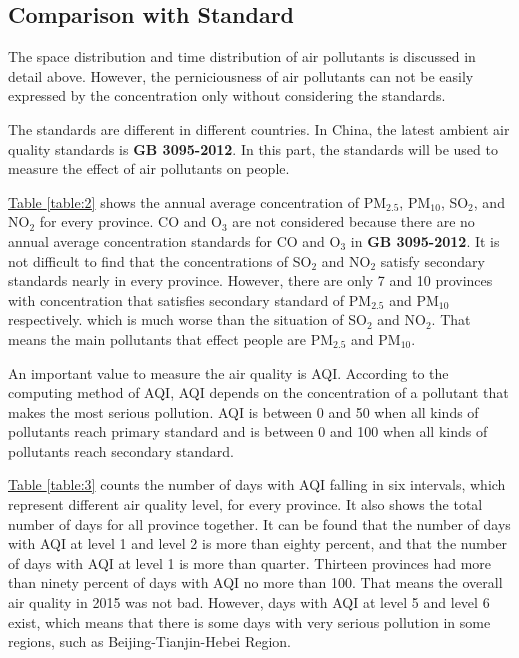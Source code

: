 \documentclass[letterpaper]{article}
\begin{document}
\begin{CJK*}{UTF8}{gkai}
\section{Comparison with Standard}

The space distribution and time distribution of air pollutants is discussed in detail above. However, the perniciousness of air pollutants can not be easily expressed by the concentration only without considering the standards.

The standards are different in different countries. In China, the latest ambient air quality standards is \textbf{GB 3095-2012}. In this part, the standards will be used to measure the effect of air pollutants on people.

\hyperref[table:2]{Table \ref*{table:2}} shows the annual average concentration of PM$_{2.5}$, PM$_{10}$, SO$_{2}$, and NO$_{2}$ for every province. CO and O$_{3}$ are not considered because there are no annual average concentration standards for CO and O$_{3}$ in \textbf{GB 3095-2012}. It is not difficult to find that the concentrations of SO$_{2}$ and NO$_{2}$ satisfy secondary standards nearly in every province. However, there are only 7 and 10 provinces with concentration that satisfies secondary standard of PM$_{2.5}$ and PM$_{10}$ respectively. which is much worse than the situation of SO$_{2}$ and NO$_{2}$. That means the main pollutants that effect people are PM$_{2.5}$ and PM$_{10}$.

An important value to measure the air quality is AQI. According to the computing method of AQI, AQI depends on the concentration of a pollutant that makes the most serious pollution. AQI is between 0 and 50 when all kinds of pollutants reach primary standard and is between 0 and 100 when all kinds of pollutants reach secondary standard.


\hyperref[table:3]{Table \ref*{table:3}} counts the number of days with AQI falling in six intervals, which represent different air quality level, for every province. It also shows the total number of days for all province together. It can be found that the number of days with AQI at level 1 and level 2 is more than eighty percent, and that the number of days with AQI at level 1 is more than quarter. Thirteen provinces had more than ninety percent of days with AQI no more than 100. That means the overall air quality in 2015 was not bad. However, days with AQI at level 5 and level 6 exist, which means that there is some days with very serious pollution in some regions, such as Beijing-Tianjin-Hebei Region.


\end{CJK*}
\end{document}
